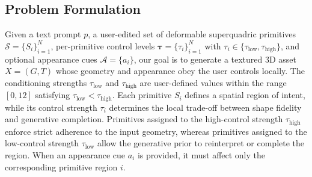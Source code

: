\subsection{Problem Formulation}
Given a text prompt $p$, a user-edited set of deformable superquadric primitives $\mathcal{S}=\{S_i\}_{i=1}^{N}$, per-primitive control levels $\boldsymbol{\tau}=\{\tau_i\}_{i=1}^{N}$ with $\tau_i \in \{\tau_{\text{low}}, \tau_{\text{high}}\}$, and optional appearance cues $\mathcal{A}=\{a_i\}$, our goal is to generate a textured 3D asset $X=(G,T)$ whose geometry and appearance obey the user controls locally. The conditioning strengths $\tau_{\text{low}}$ and $\tau_{\text{high}}$ are user-defined values within the range $[0, 12]$ satisfying $\tau_{\text{low}} < \tau_{\text{high}}$. Each primitive $S_i$ defines a spatial region of intent, while its control strength $\tau_i$ determines the local trade-off between shape fidelity and generative completion. Primitives assigned to the high-control strength $\tau_{\text{high}}$ enforce strict adherence to the input geometry, whereas primitives assigned to the low-control strength $\tau_{\text{low}}$ allow the generative prior to reinterpret or complete the region. When an appearance cue $a_i$ is provided, it must affect only the corresponding primitive region $i$.


